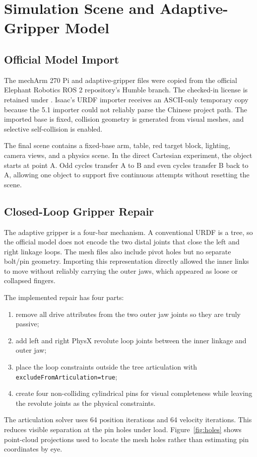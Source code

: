 \documentclass[UTF8,zihao=-4,scheme=chinese,fontset=none]{ctexart}
\begin{document}
\section{Simulation Scene and Adaptive-Gripper Model}
\subsection{Official Model Import}
The mechArm 270 Pi and adaptive-gripper files were copied from the official Elephant Robotics ROS 2 repository's Humble branch. The checked-in license is retained under . Isaac's URDF importer receives an ASCII-only temporary copy because the 5.1 importer could not reliably parse the Chinese project path. The imported base is fixed, collision geometry is generated from visual meshes, and selective self-collision is enabled.

The final scene contains a fixed-base arm, table, red target block, lighting, camera views, and a physics scene. In the direct Cartesian experiment, the object starts at point A. Odd cycles transfer A to B and even cycles transfer B back to A, allowing one object to support five continuous attempts without resetting the scene.

\subsection{Closed-Loop Gripper Repair}
The adaptive gripper is a four-bar mechanism. A conventional URDF is a tree, so the official model does not encode the two distal joints that close the left and right linkage loops. The mesh files also include pivot holes but no separate bolt/pin geometry. Importing this representation directly allowed the inner links to move without reliably carrying the outer jaws, which appeared as loose or collapsed fingers.

The implemented repair has four parts:
\begin{enumerate}
\item remove all drive attributes from the two outer jaw joints so they are truly passive;
\item add left and right PhysX revolute loop joints between the inner linkage and outer jaw;
\item place the loop constraints outside the tree articulation with \texttt{excludeFromArticulation=true};
\item create four non-colliding cylindrical pins for visual completeness while leaving the revolute joints as the physical constraints.
\end{enumerate}
The articulation solver uses 64 position iterations and 64 velocity iterations. This reduces visible separation at the pin holes under load. Figure~\ref{fig:holes} shows point-cloud projections used to locate the mesh holes rather than estimating pin coordinates by eye.
\end{document}
